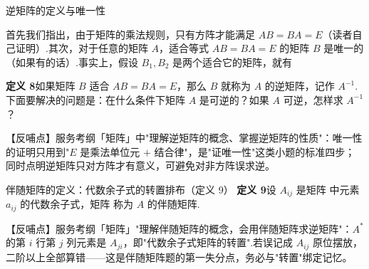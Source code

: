 

\begin{fdeep}{逆矩阵的定义与唯一性}

首先我们指出，由于矩阵的乘法规则，只有方阵才能满足 $AB=BA=E$（读者自己证明）.其次，对于任意的矩阵 $A$，适合等式 $AB=BA=E$ 的矩阵 $B$ 是唯一的（如果有的话）.事实上，假设 $B_1,B_2$ 是两个适合它的矩阵，就有

\textbf{定义 8}\quad 如果矩阵 $B$ 适合 $AB=BA=E$，那么 $B$ 就称为 $A$ 的逆矩阵，记作 $A^{-1}$.下面要解决的问题是：在什么条件下矩阵 $A$ 是可逆的？如果 $A$ 可逆，怎样求 $A^{-1}$？

【反哺点】服务考纲「矩阵」中"理解逆矩阵的概念、掌握逆矩阵的性质"：唯一性的证明只用到"$E$ 是乘法单位元 $+$ 结合律"，是"证唯一性"这类小题的标准四步；同时点明逆矩阵只对方阵才有意义，可避免对非方阵误求逆。
\end{fdeep}


\begin{fdeep}{伴随矩阵的定义：代数余子式的转置排布（定义 9）}
\textbf{定义 9}\quad 设 $A_{ij}$ 是矩阵
中元素 $a_{ij}$ 的代数余子式，矩阵
称为 $A$ 的伴随矩阵.

【反哺点】服务考纲「矩阵」"理解伴随矩阵的概念，会用伴随矩阵求逆矩阵"：$A^{*}$ 的第 $i$ 行第 $j$ 列元素是 $A_{ji}$，即"代数余子式矩阵的转置".若误记成 $A_{ij}$ 原位摆放，二阶以上全部算错——这是伴随矩阵题的第一失分点，务必与"转置"绑定记忆。
\end{fdeep}


